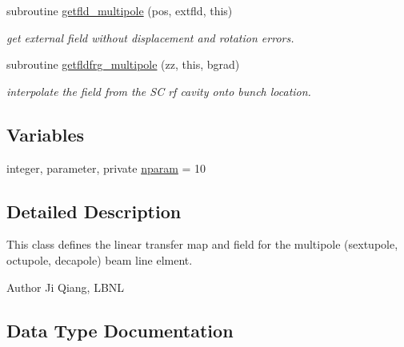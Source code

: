 \begin{DoxyCompactItemize}
subroutine \mbox{\hyperlink{namespacemultipoleclass_af4fb9d3cfd9db2d92930fcda605fbe26}{getfld\+\_\+multipole}} (pos, extfld, this)
\begin{DoxyCompactList}\small\item\em get external field without displacement and rotation errors. \end{DoxyCompactList}\item 
subroutine \mbox{\hyperlink{namespacemultipoleclass_a8712b7622d8ed7c0e71cdc18204dcf46}{getfldfrg\+\_\+multipole}} (zz, this, bgrad)
\begin{DoxyCompactList}\small\item\em interpolate the field from the SC rf cavity onto bunch location. \end{DoxyCompactList}\end{DoxyCompactItemize}
\subsection*{Variables}
\begin{DoxyCompactItemize}
\item 
integer, parameter, private \mbox{\hyperlink{namespacemultipoleclass_a67bb1a71461cf39cdd365adab7fec8b9}{nparam}} = 10
\end{DoxyCompactItemize}


\subsection{Detailed Description}
This class defines the linear transfer map and field for the multipole (sextupole, octupole, decapole) beam line elment. 

\begin{DoxyAuthor}{Author}
Ji Qiang, L\+B\+NL 
\end{DoxyAuthor}


\subsection{Data Type Documentation}
\label{structmultipoleclass_1_1multipole}
